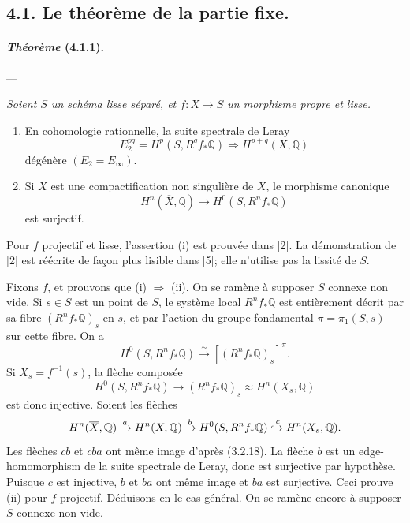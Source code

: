 \documentclass[10pt]{article}
\newcommand{\Q}{\mathbb Q}
\newcommand{\fg}{\guillemotright}
\newcommand{\og}{\guillemotleft}
\begin{document}
\subsection*{4.1. Le théorème de la partie fixe.}

\paragraph{\emph{Théorème} (4.1.1).} --- {\itshape Soient $S$ un schéma lisse séparé, et $f:X\to S$ un morphisme propre et lisse.
\begin{enumerate}[label=(\roman*),font=\itshape]
\item En cohomologie rationnelle, la suite spectrale de Leray
\[
E_2^{pq}=H^p(S,R^qf_*\Q)\Longrightarrow H^{p+q}(X,\Q)
\]
dégénère $(E_2=E_\infty)$.
\item Si $\overline X$ est une compactification non singulière de $X$, le morphisme canonique
\[
H^n(\overline X,\Q)\longrightarrow H^0(S,R^nf_*\Q)
\]
est surjectif.
\end{enumerate}}

Pour $f$ projectif et lisse, l'assertion (i) est prouvée dans [2]. La démonstration de [2] est réécrite de façon plus lisible dans [5]; elle n'utilise pas la lissité de $S$.

Fixons $f$, et prouvons que (i) $\Rightarrow$ (ii). On se ramène à supposer $S$ connexe non vide. Si $s\in S$ est un point de $S$, le système local $R^nf_*\Q$ est entièrement décrit par sa fibre $(R^nf_*\Q)_s$ en $s$, et par l'action du groupe fondamental $\pi=\pi_1(S,s)$ sur cette fibre. On a
\[
H^0(S,R^nf_*\Q)\xrightarrow{\sim}[(R^nf_*\Q)_s]^\pi.
\]
Si $X_s=f^{-1}(s)$, la flèche composée
\[
H^0(S,R^nf_*\Q)\longrightarrow (R^nf_*\Q)_s\approx H^n(X_s,\Q)
\]
est donc injective. Soient les flèches
\[
H^n(\overline X,\Q)\xrightarrow{a}H^n(X,\Q)\xrightarrow{b}
H^0(S,R^nf_*\Q)\xhookrightarrow{c}H^n(X_s,\Q).
\]
Les flèches $cb$ et $cba$ ont même image d'après (3.2.18). La flèche $b$ est un \og edge-homomorphism\fg{} de la suite spectrale de Leray, donc est surjective par hypothèse. Puisque $c$ est injective, $b$ et $ba$ ont même image et $ba$ est surjective. Ceci prouve (ii) pour $f$ projectif. Déduisons-en le cas général. On se ramène encore à supposer $S$ connexe non vide.
\end{document}
